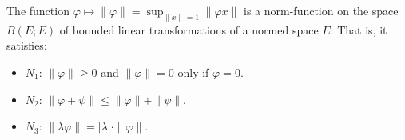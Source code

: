 The function $\varphi \mapsto \|\varphi\| = \sup_{\|x\|=1} \|\varphi x\|$ is a norm-function on the space $B(E;E)$ of bounded linear transformations of a normed space $E$. That is, it satisfies:

\begin{itemize}
\item $N_1$: $\|\varphi\| \geq 0$ and $\|\varphi\| = 0$ only if $\varphi = 0$.
\item $N_2$: $\|\varphi + \psi\| \leq \|\varphi\| + \|\psi\|$.
\item $N_3$: $\|\lambda \varphi\| = |\lambda| \cdot \|\varphi\|$.
\end{itemize}
